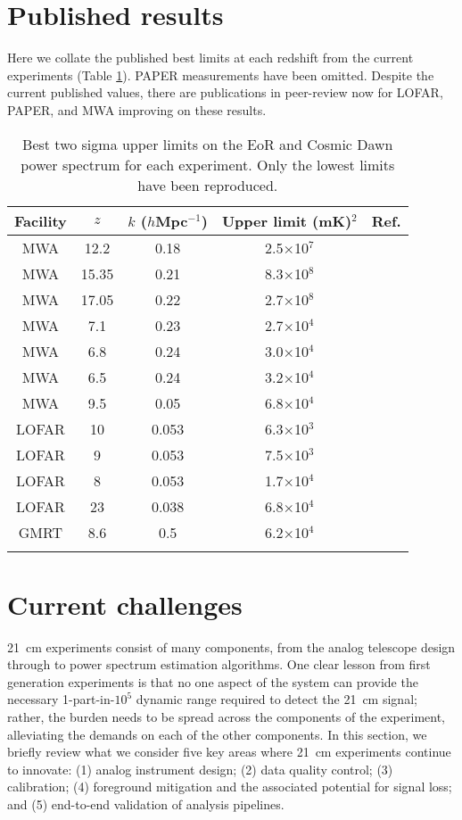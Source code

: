 \section{Published results}
\label{sec:results}
Here we collate the published best limits at each redshift from the current experiments (Table \ref{table:limits}). PAPER measurements have been omitted. Despite the current published values, there are publications in peer-review now for LOFAR, PAPER, and MWA improving on these results.
\begin{table}[ht]
\centering
\begin{tabular}{|c|c|c|c|c|}
\hline
Facility & $z$ & $k$ ($h$Mpc$^{-1}$) & Upper limit (mK)$^2$ & Ref. \\
\hline
MWA & 12.2 & 0.18 & 2.5$\times$10$^7$ & \cite{ewall-wice16}\\
MWA & 15.35 & 0.21 & 8.3$\times$10$^8$ & \cite{ewall-wice16}\\
MWA & 17.05 & 0.22 & 2.7$\times$10$^8$ & \cite{ewall-wice16}\\
MWA & 7.1 & 0.23 & 2.7$\times$10$^4$ & \cite{beardsley16}\\
MWA & 6.8 & 0.24 & 3.0$\times$10$^4$ & \cite{beardsley16}\\
MWA & 6.5 & 0.24 & 3.2$\times$10$^4$ & \cite{beardsley16}\\
MWA & 9.5 & 0.05 & 6.8$\times$10$^4$ & \cite{dillon15}\\
LOFAR & 10 & 0.053 & 6.3$\times$10$^3$ & \cite{patil16}\\
LOFAR & 9 & 0.053 & 7.5$\times$10$^3$ & \cite{patil16}\\
LOFAR & 8 & 0.053 & 1.7$\times$10$^4$ & \cite{patil16}\\
LOFAR & 23 & 0.038 & 6.8$\times$10$^4$ & \cite{2018arXiv180906661G}\\
GMRT & 8.6 & 0.5 & 6.2$\times$10$^4$ & \cite{paciga13}\\
\hline
\label{table:limits}
\end{tabular}
\caption{Best two sigma upper limits on the EoR and Cosmic Dawn power spectrum for each experiment. Only the lowest limits have been reproduced.}
\end{table}


\section{Current challenges}
\label{sec:challenges}
21~cm experiments consist of many components, from the analog telescope design through to power spectrum estimation algorithms.  One clear lesson from first generation experiments is that no one aspect of the system can provide the necessary 1-part-in-$10^5$ dynamic range required to detect the 21~cm signal; rather, the burden needs to be spread across the components of the experiment, alleviating the demands on each of the other components.  In this section, we briefly review what we consider five key areas where 21~cm experiments continue to innovate: (1) analog instrument design; (2) data quality control; (3) calibration; (4) foreground mitigation and the associated potential for signal loss; and (5) end-to-end validation of analysis pipelines.

